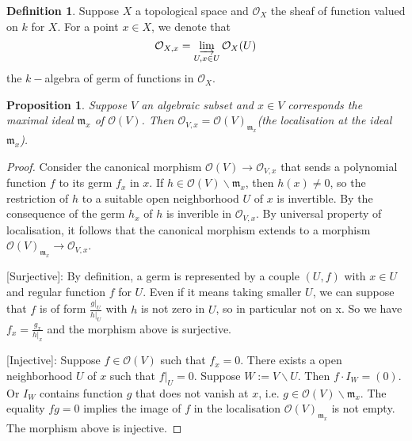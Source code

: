 \documentclass[12pt,a4paper,english]{article}
\theoremstyle{plain}
\newtheorem{prop}[thm]{Proposition}
\theoremstyle{definition}
\newtheorem{defi}{Definition}
\theoremstyle{remark}
\begin{document}
\begin{defi}
Suppose $X$ a topological space and $\mathcal{O}_{X}$ the sheaf of function valued on $k$ for $X$. For a point $x\in X$, we denote that 
\begin{equation*}
    \mathcal{O}_{X,x}=\varinjlim_{U,x\in U}\mathcal{O}_{X}(U)
\end{equation*}
the $k-$algebra of germ of functions in $\mathcal{O}_{X}$.
\end{defi}
\begin{prop}
Suppose $V$ an algebraic subset and $x\in V$ corresponds the maximal ideal $\mathfrak{m}_{x}$ of $\mathcal{O}(V)$. Then $\mathcal{O}_{V,x}=\mathcal{O}(V)_{\mathfrak{m}_{x}}$(the localisation at the ideal $\mathfrak{m}_{x}$).
\end{prop}
\begin{proof}
Consider the canonical morphism $\mathcal{O}(V)\rightarrow \mathcal{O}_{V,x}$ that sends a polynomial function $f$ to its germ $f_{x}$ in $x$. If $h\in \mathcal{O}(V)\backslash \mathfrak{m}_{x}$, then $h(x)\not=0$, so the restriction of $h$ to a suitable open neighborhood $U$ of $x$ is invertible. By the consequence of the germ $h_{x}$ of $h$ is inverible in $\mathcal{O}_{V,x}$. By universal property of localisation, it follows that the canonical morphism extends to a morphism $\mathcal{O}(V)_{\mathfrak{m}_{x}}\rightarrow \mathcal{O}_{V,x}$.

[Surjective]: By definition, a germ is represented by a couple $(U,f)$ with $x\in U$ and regular function $f$ for $U$. Even if it means taking smaller $U$, we can suppose that $f$ is of form $\frac{g|_{U}}{h|_{U}}$ with $h$ is not zero in $U$, so in particular not on x. So we have $f_{x}=\frac{g_{x}}{h|_{x}}$ and the morphism above is surjective.

[Injective]: Suppose $f\in\mathcal{O}(V)$ such that $f_{x}=0$. There exists a open neighborhood $U$ of $x$ such that $f|_{U}=0$. Suppose $W:=V\backslash U$. Then $f\cdot I_{W}=(0)$. Or $I_{W}$ contains function $g$ that does not vanish at $x$, i.e. $g\in \mathcal{O}(V)\backslash \mathfrak{m}_{x}$. The equality $fg=0$ implies the image of $f$ in the localisation $\mathcal{O}(V)_{\mathfrak{m}_{x}}$ is not empty. The morphism above is injective.
\end{proof}
\end{document}
